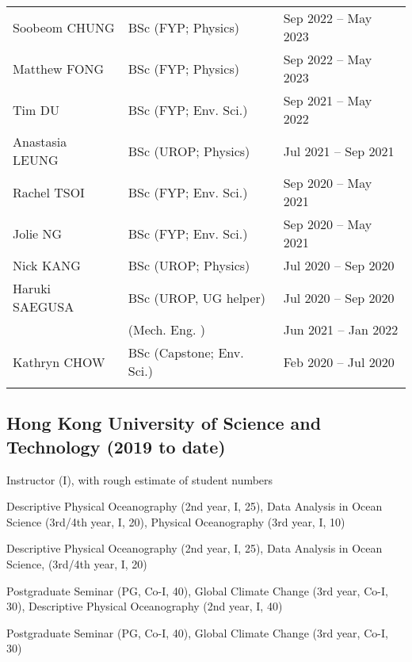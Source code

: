 \documentclass[letterpaper]{article}
\renewenvironment{itemize}{
  \begin{list}{}{
    \setlength{\leftmargin}{1.5em}
  }
}{
  \end{list}
}
\begin{document}
\begin{tabularx}{\textwidth}{XXX}
  Soobeom CHUNG           & BSc (FYP; Physics)    & Sep 2022 -- May 2023\\
  Matthew FONG            & BSc (FYP; Physics)    & Sep 2022 -- May 2023\\
  Tim DU                  & BSc (FYP; Env. Sci.)  & Sep 2021 -- May 2022\\
  Anastasia LEUNG         & BSc (UROP; Physics)   & Jul 2021 -- Sep 2021\\
  Rachel TSOI             & BSc (FYP; Env. Sci.)  & Sep 2020 -- May 2021\\
  Jolie NG                & BSc (FYP; Env. Sci.)  & Sep 2020 -- May 2021\\
  Nick KANG               & BSc (UROP; Physics)   & Jul 2020 -- Sep 2020\\
  Haruki SAEGUSA          & BSc (UROP, UG helper) & Jul 2020 -- Sep 2020\\
                          &     (Mech. Eng.     ) & Jun 2021 -- Jan 2022\\
  Kathryn CHOW            & BSc (Capstone; Env. Sci.) & Feb 2020 -- Jul 2020\\
  \\
\end{tabularx}

\subsection*{Hong Kong University of Science and Technology (2019 to date)}
\begin{itemize}
\item Instructor (I), with rough estimate of
student numbers
\begin{itemize}
  \item[22/23:] Descriptive Physical Oceanography (2nd year, I, 25), Data
  Analysis in Ocean Science (3rd/4th year, I, 20), Physical Oceanography (3rd year, I, 10)
  \item[21/22:] Descriptive Physical Oceanography (2nd year, I, 25), Data
  Analysis in Ocean Science, (3rd/4th year, I, 20)
  \item[20/21:] Postgraduate Seminar (PG, Co-I, 40), Global Climate Change (3rd
  year, Co-I, 30), Descriptive Physical Oceanography (2nd year, I, 40)
  \item[19/20:] Postgraduate Seminar (PG, Co-I, 40), Global Climate Change (3rd
  year, Co-I, 30)
\end{itemize}
\end{itemize}
\end{document}
